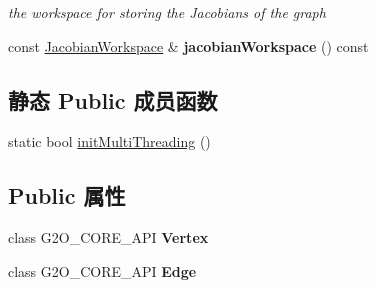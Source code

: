 \begin{DoxyCompactItemize}
\begin{DoxyCompactList}\small\item\em the workspace for storing the Jacobians of the graph \end{DoxyCompactList}\item 
\hypertarget{structg2o_1_1OptimizableGraph_a2a8f800437cd846bad1df57b0b8c273e}{const \hyperlink{classg2o_1_1JacobianWorkspace}{Jacobian\-Workspace} \& {\bfseries jacobian\-Workspace} () const }\label{structg2o_1_1OptimizableGraph_a2a8f800437cd846bad1df57b0b8c273e}

\end{DoxyCompactItemize}
\subsection*{静态 Public 成员函数}
\begin{DoxyCompactItemize}
\item 
static bool \hyperlink{structg2o_1_1OptimizableGraph_ab4ee0fc3ecd31852276ded40b62e9c76}{init\-Multi\-Threading} ()
\end{DoxyCompactItemize}
\subsection*{Public 属性}
\begin{DoxyCompactItemize}
\item 
\hypertarget{structg2o_1_1OptimizableGraph_ae1bdcfc2f7a1b8977ba04a16b16f1eba}{class G2\-O\-\_\-\-C\-O\-R\-E\-\_\-\-A\-P\-I {\bfseries Vertex}}\label{structg2o_1_1OptimizableGraph_ae1bdcfc2f7a1b8977ba04a16b16f1eba}

\item 
\hypertarget{structg2o_1_1OptimizableGraph_a59cf44f3f3182a367ee4525412c7940a}{class G2\-O\-\_\-\-C\-O\-R\-E\-\_\-\-A\-P\-I {\bfseries Edge}}\label{structg2o_1_1OptimizableGraph_a59cf44f3f3182a367ee4525412c7940a}

\end{DoxyCompactItemize}

